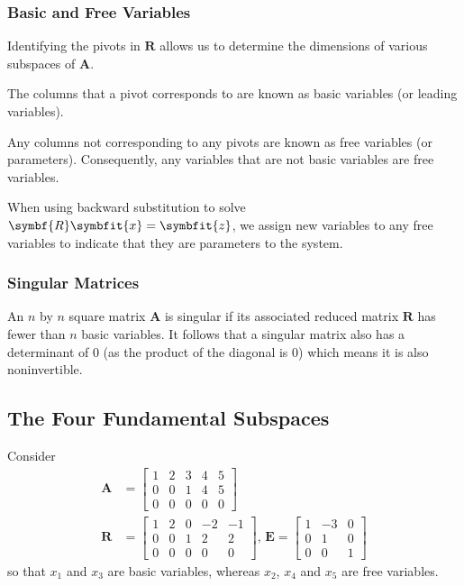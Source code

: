 \documentclass{article}
\begin{document}
\subsubsection{Basic and Free Variables}
Identifying the pivots in \(\symbf{R}\) allows us to determine
the dimensions of various subspaces of \(\symbf{A}\).
\begin{definition}
    The columns that a pivot corresponds to are known as basic variables (or leading variables).
\end{definition}
\begin{definition}
    Any columns not corresponding to any pivots are known as free variables (or parameters).
    Consequently, any variables that are not basic variables are free variables.
\end{definition}
When using backward substitution to solve \(\symbf{R} \symbfit{x} = \symbfit{z}\), we assign new variables
to any free variables to indicate that they are parameters to the system.
\subsubsection{Singular Matrices}
An \(n\) by \(n\) square matrix \(\symbf{A}\) is singular if its associated reduced matrix \(\symbf{R}\) has fewer than \(n\) basic variables.
It follows that a singular matrix also has a determinant of 0 (as the product of the diagonal is 0) which means it is also noninvertible.
\subsection{The Four Fundamental Subspaces}
Consider
\begin{align*}
    \symbf{A} & =
    \begin{bmatrix}
        1 & 2 & 3 & 4 & 5 \\
        0 & 0 & 1 & 4 & 5 \\
        0 & 0 & 0 & 0 & 0
    \end{bmatrix} \\
    \symbf{R} & =
    \begin{bmatrix}
        1 & 2 & 0 & -2 & -1 \\
        0 & 0 & 1 & 2  & 2  \\
        0 & 0 & 0 & 0  & 0
    \end{bmatrix}, \,
    \symbf{E} =
    \begin{bmatrix}
        1 & -3 & 0 \\
        0 & 1  & 0 \\
        0 & 0  & 1
    \end{bmatrix}
\end{align*}
so that \(x_1\) and \(x_3\) are basic variables, whereas \(x_2\), \(x_4\) and \(x_5\) are free variables.
\end{document}
